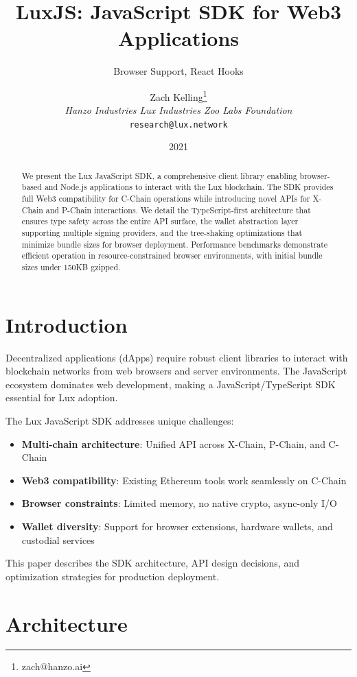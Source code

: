 \documentclass[11pt,twocolumn]{article}
\title{\textbf{LuxJS: JavaScript SDK for Web3 Applications}}
\subtitle{Browser Support, React Hooks}
\author{Zach Kelling\thanks{zach@hanzo.ai} \\ \textit{Hanzo Industries \quad Lux Industries \quad Zoo Labs Foundation} \\ \texttt{research@lux.network}}
\date{2021}
\begin{document}
\maketitle

\begin{abstract}
We present the Lux JavaScript SDK, a comprehensive client library enabling browser-based and Node.js applications to interact with the Lux blockchain. The SDK provides full Web3 compatibility for C-Chain operations while introducing novel APIs for X-Chain and P-Chain interactions. We detail the TypeScript-first architecture that ensures type safety across the entire API surface, the wallet abstraction layer supporting multiple signing providers, and the tree-shaking optimizations that minimize bundle sizes for browser deployment. Performance benchmarks demonstrate efficient operation in resource-constrained browser environments, with initial bundle sizes under 150KB gzipped.
\end{abstract}

\section{Introduction}

Decentralized applications (dApps) require robust client libraries to interact with blockchain networks from web browsers and server environments. The JavaScript ecosystem dominates web development, making a JavaScript/TypeScript SDK essential for Lux adoption.

The Lux JavaScript SDK addresses unique challenges:

\begin{itemize}
    \item \textbf{Multi-chain architecture}: Unified API across X-Chain, P-Chain, and C-Chain
    \item \textbf{Web3 compatibility}: Existing Ethereum tools work seamlessly on C-Chain
    \item \textbf{Browser constraints}: Limited memory, no native crypto, async-only I/O
    \item \textbf{Wallet diversity}: Support for browser extensions, hardware wallets, and custodial services
\end{itemize}

This paper describes the SDK architecture, API design decisions, and optimization strategies for production deployment.

\section{Architecture}
\end{document}
